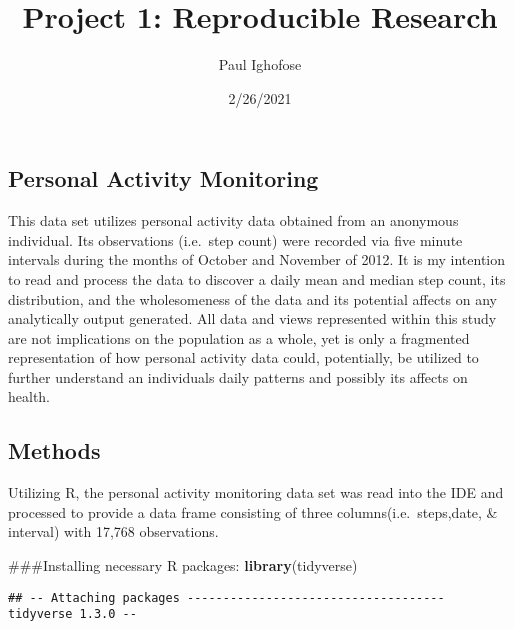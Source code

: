 \documentclass[]{article}
\title{Project 1: Reproducible Research}
\author{Paul Ighofose}
\date{2/26/2021}
\newenvironment{Shaded}{\begin{snugshade}}{\end{snugshade}}
\newcommand{\KeywordTok}[1]{\textcolor[rgb]{0.13,0.29,0.53}{\textbf{#1}}}
\newcommand{\DataTypeTok}[1]{\textcolor[rgb]{0.13,0.29,0.53}{#1}}
\newcommand{\OtherTok}[1]{\textcolor[rgb]{0.56,0.35,0.01}{#1}}
\newcommand{\OperatorTok}[1]{\textcolor[rgb]{0.81,0.36,0.00}{\textbf{#1}}}
\newcommand{\NormalTok}[1]{#1}
\begin{document}
\maketitle

\begin{Shaded}
\end{Shaded}

\subsection{Personal Activity
Monitoring}\label{personal-activity-monitoring}

This data set utilizes personal activity data obtained from an anonymous
individual. Its observations (i.e.~step count) were recorded via five
minute intervals during the months of October and November of 2012. It
is my intention to read and process the data to discover a daily mean
and median step count, its distribution, and the wholesomeness of the
data and its potential affects on any analytically output generated. All
data and views represented within this study are not implications on the
population as a whole, yet is only a fragmented representation of how
personal activity data could, potentially, be utilized to further
understand an individuals daily patterns and possibly its affects on
health.

\subsection{Methods}\label{methods}

Utilizing R, the personal activity monitoring data set was read into the
IDE and processed to provide a data frame consisting of three
columns(i.e.~steps,date, \& interval) with 17,768 observations.

\begin{Shaded}
\begin{Highlighting}[]
\NormalTok{###Installing necessary R packages:}
\KeywordTok{library}\NormalTok{(tidyverse)}
\end{Highlighting}
\end{Shaded}

\begin{verbatim}
## -- Attaching packages ------------------------------------ tidyverse 1.3.0 --
\end{verbatim}
\end{document}
